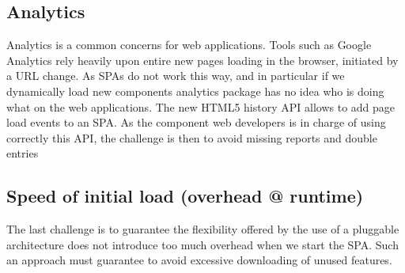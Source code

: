 \subsection{Analytics}

Analytics is a common concerns for web applications. Tools such as Google Analytics rely heavily upon entire new pages loading in the browser, initiated by a URL change. As SPAs do not work this way, and in particular if we dynamically load new components analytics package has no idea who is doing what on the web applications. The new HTML5 history API allows to add page load events to an SPA. As the component web developers is in charge of using correctly this API, the challenge is then to avoid missing reports and double entries   
\subsection{Speed of initial load (overhead @ runtime) }
The last challenge is to guarantee the flexibility offered by the use of a pluggable architecture does not introduce too much overhead when we start the SPA. Such an approach must guarantee to  avoid excessive downloading of unused features. 
